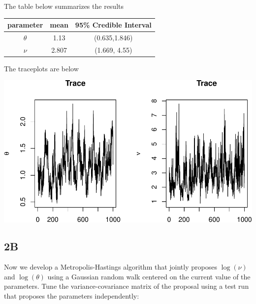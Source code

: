 \documentclass[]{article}
\begin{document}
The table below summarizes the results

\begin{center}
\begin{tabular}{ |c|c|c| }
\hline
 parameter & mean & 95\% Credible Interval \\ 
 \hline
 $\theta$ & 1.13 & (0.635,1.846) \\  
 $\nu$ & 2.807 & (1.669, 4.55)\\
 \hline
\end{tabular}
\end{center}

The traceplots are below

\includegraphics{AMS206b_H4_files/figure-latex/unnamed-chunk-16-1.pdf}

\subsection{2B}\label{b-1}

Now we develop a Metropolis-Hastings algorithm that jointly proposes
\(\log(\nu)\) and \(\log(\theta)\) using a Gaussian random walk centered
on the current value of the parameters. Tune the variance-covariance
matrix of the proposal using a test run that proposes the parameters
independently:
\end{document}
